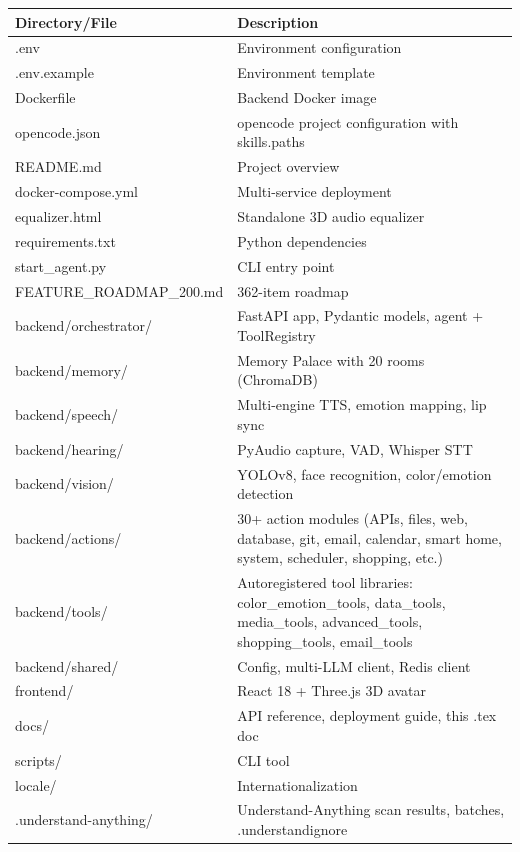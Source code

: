 \documentclass[12pt,a4paper,twoside]{report}
\begin{document}
\begin{longtable}{|l|X|}
\hline
\rowcolor{phiblue!20}
\textbf{Directory/File} & \textbf{Description} \\
\hline
\endhead
.env & Environment configuration \\
\hline
.env.example & Environment template \\
\hline
Dockerfile & Backend Docker image \\
\hline
opencode.json & opencode project configuration with skills.paths \\
\hline
README.md & Project overview \\
\hline
docker-compose.yml & Multi-service deployment \\
\hline
equalizer.html & Standalone 3D audio equalizer \\
\hline
requirements.txt & Python dependencies \\
\hline
start\_agent.py & CLI entry point \\
\hline
FEATURE\_ROADMAP\_200.md & 362-item roadmap \\
\hline
backend/orchestrator/ & FastAPI app, Pydantic models, agent + ToolRegistry \\
\hline
backend/memory/ & Memory Palace with 20 rooms (ChromaDB) \\
\hline
backend/speech/ & Multi-engine TTS, emotion mapping, lip sync \\
\hline
backend/hearing/ & PyAudio capture, VAD, Whisper STT \\
\hline
backend/vision/ & YOLOv8, face recognition, color/emotion detection \\
\hline
backend/actions/ & 30+ action modules (APIs, files, web, database, git, email, calendar, smart home, system, scheduler, shopping, etc.) \\
\hline
backend/tools/ & Autoregistered tool libraries: color\_emotion\_tools, data\_tools, media\_tools, advanced\_tools, shopping\_tools, email\_tools \\
\hline
backend/shared/ & Config, multi-LLM client, Redis client \\
\hline
frontend/ & React 18 + Three.js 3D avatar \\
\hline
docs/ & API reference, deployment guide, this .tex doc \\
\hline
scripts/ & CLI tool \\
\hline
locale/ & Internationalization \\
\hline
.understand-anything/ & Understand-Anything scan results, batches, .understandignore \\
\hline
\end{longtable}
\end{document}
